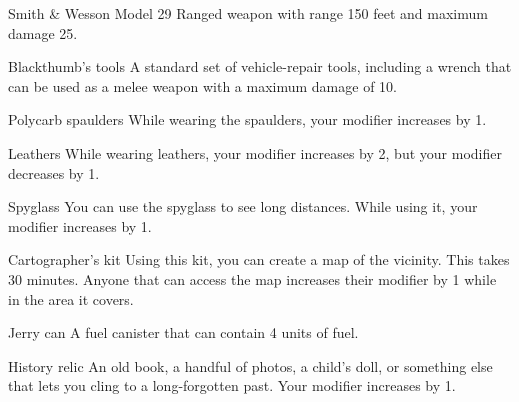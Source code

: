 \begin{describe}{Smith \& Wesson Model 29}
  Ranged weapon with range 150 feet and maximum damage 25.
\end{describe}

\begin{describe}{Blackthumb's tools}
  A standard set of vehicle-repair tools, including a wrench that can be used as a melee weapon with a maximum damage of 10.
\end{describe}

\begin{describe}{Polycarb spaulders}
  While wearing the spaulders, your  modifier increases by 1.
\end{describe}

\begin{describe}{Leathers}
  While wearing leathers, your  modifier increases by 2, but your  modifier decreases by 1.
\end{describe}

\begin{describe}{Spyglass}
  You can use the spyglass to see long distances. While using it, your  modifier increases by 1.
\end{describe}

\begin{describe}{Cartographer's kit}
  Using this kit, you can create a map of the vicinity. This takes 30 minutes. Anyone that can access the map increases their  modifier by 1 while in the area it covers.
\end{describe}

\begin{describe}{Jerry can}
  A fuel canister that can contain 4 units of fuel.
\end{describe}

\begin{describe}{History relic}
  An old book, a handful of photos, a child's doll, or something else that lets you cling to a long-forgotten past. Your  modifier increases by 1.
\end{describe}
